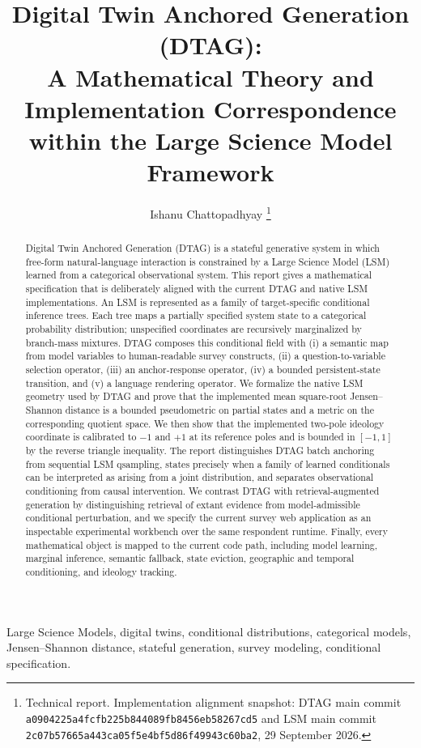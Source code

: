 \documentclass[journal]{IEEEtran}
\title{Digital Twin Anchored Generation (DTAG):\\
A Mathematical Theory and Implementation Correspondence within the Large Science Model Framework}
\author{Ishanu Chattopadhyay%
\thanks{Technical report. Implementation alignment snapshot: DTAG main commit \texttt{a0904225a4fcfb225b844089fb8456eb58267cd5} and LSM main commit \texttt{2c07b57665a443ca05f5e4bf5d86f49943c60ba2}, 29 September 2026.}}
\newcommand{\1}{\mathbf{1}}
\begin{document}
\maketitle

\begin{abstract}
Digital Twin Anchored Generation (DTAG) is a stateful generative system in which free-form natural-language interaction is constrained by a Large Science Model (LSM) learned from a categorical observational system. This report gives a mathematical specification that is deliberately aligned with the current DTAG and native LSM implementations. An LSM is represented as a family of target-specific conditional inference trees. Each tree maps a partially specified system state to a categorical probability distribution; unspecified coordinates are recursively marginalized by branch-mass mixtures. DTAG composes this conditional field with (i) a semantic map from model variables to human-readable survey constructs, (ii) a question-to-variable selection operator, (iii) an anchor-response operator, (iv) a bounded persistent-state transition, and (v) a language rendering operator. We formalize the native LSM geometry used by DTAG and prove that the implemented mean square-root Jensen--Shannon distance is a bounded pseudometric on partial states and a metric on the corresponding quotient space. We then show that the implemented two-pole ideology coordinate is calibrated to $-1$ and $+1$ at its reference poles and is bounded in $[-1,1]$ by the reverse triangle inequality. The report distinguishes DTAG batch anchoring from sequential LSM qsampling, states precisely when a family of learned conditionals can be interpreted as arising from a joint distribution, and separates observational conditioning from causal intervention. We contrast DTAG with retrieval-augmented generation by distinguishing retrieval of extant evidence from model-admissible conditional perturbation, and we specify the current survey web application as an inspectable experimental workbench over the same respondent runtime. Finally, every mathematical object is mapped to the current code path, including model learning, marginal inference, semantic fallback, state eviction, geographic and temporal conditioning, and ideology tracking.
\end{abstract}

\begin{IEEEkeywords}
Large Science Models, digital twins, conditional distributions, categorical models, Jensen--Shannon distance, stateful generation, survey modeling, conditional specification.
\end{IEEEkeywords}
\end{document}
